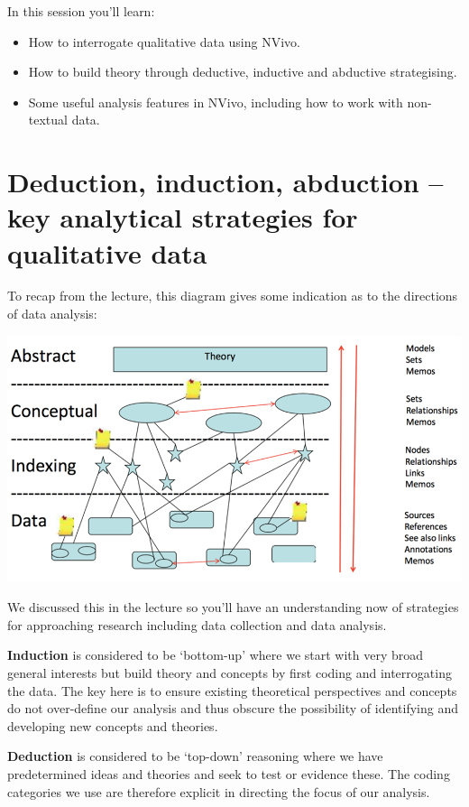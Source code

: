 \documentclass[
]{book}
\providecommand{\tightlist}{%
  \setlength{\itemsep}{0pt}\setlength{\parskip}{0pt}}
\begin{document}
In this session you'll learn:

\begin{itemize}
\tightlist
\item
  How to interrogate qualitative data using NVivo.
\item
  How to build theory through deductive, inductive and abductive strategising.
\item
  Some useful analysis features in NVivo, including how to work with non-textual data.
\end{itemize}

\hypertarget{deduction-induction-abduction-key-analytical-strategies-for-qualitative-data}{%
\section{Deduction, induction, abduction -- key analytical strategies for qualitative data}\label{deduction-induction-abduction-key-analytical-strategies-for-qualitative-data}}

To recap from the lecture, this diagram gives some indication as to the directions of data analysis:

\includegraphics{imgs/diagram_quali.png}

We discussed this in the lecture so you'll have an understanding now of strategies for approaching research including data collection and data analysis.

\textbf{Induction} is considered to be `bottom-up' where we start with very broad general interests but build theory and concepts by first coding and interrogating the data. The key here is to ensure existing theoretical perspectives and concepts do not over-define our analysis and thus obscure the possibility of identifying and developing new concepts and theories.

\textbf{Deduction} is considered to be `top-down' reasoning where we have predetermined ideas and theories and seek to test or evidence these. The coding categories we use are therefore explicit in directing the focus of our analysis.
\end{document}
